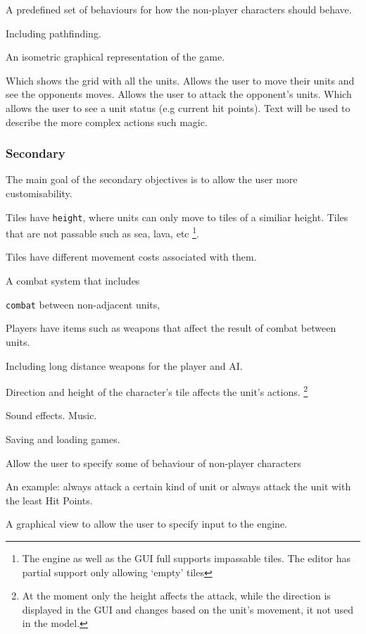 \begin{itemize}
\begin{itemize}
\begin{itemize}
		\end{itemize}
	
	\tick A predefined set of behaviours for how the non-player characters should behave.
	\begin{itemize}
		\tick Including pathfinding.
	\end{itemize}
	
	\tick An isometric graphical representation of the game.
	\begin{itemize}
		\tick Which shows the grid with all the units.
		\tick Allows the user to move their units and see the opponents moves.
		\tick Allows the user to attack the opponent's units.
		\tick Which allows the user to see a unit status (e.g current hit points).
		\tick Text will be used to describe the more complex actions such magic.
	\end{itemize}
\end{itemize}
\end{itemize}

\subsubsection{Secondary}
\label{secondary}

The main goal of the secondary objectives is to allow the user more customisability. 
\begin{itemize}
	\tick Tiles have \texttt{height}, where units can only move to tiles of a similiar height.
	\tick Tiles that are not passable such as sea, lava, etc \footnote{The engine as well as the GUI full supports impassable tiles. The editor has partial support only allowing `empty' tiles }.
	
	\tick Tiles have different movement costs associated with them.
	
	\tick A combat system that includes 
	\begin{itemize}
		\tick \texttt{combat} between non-adjacent units,
	\end{itemize}
	
	\tick Players have items such as weapons that affect the result of combat between units. 
	\begin{itemize}
		\tick Including long distance weapons for the player and AI.
	\end{itemize}
	
	\tick Direction and height of the character's tile affects the unit's actions. \footnote{At the moment only the height affects the attack, while the direction is displayed in the GUI and changes based on the unit's movement, it not used in the model.}
	
	\tick Sound effects.
	\tick Music.
	
	\tick Saving and loading games.
	
	\tick Allow the user to specify some of behaviour of non-player characters
	\begin{itemize}
		\tick An example: always attack a certain kind of unit or always attack the unit with the least Hit Points.
	\end{itemize}
	
	\tick A graphical view to allow the user to specify input to the engine.
\end{itemize}

